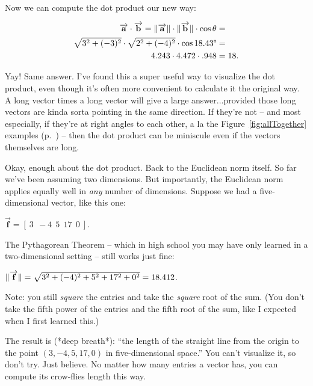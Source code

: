 Now we can compute the dot product our new way:

\vspace{-.15in}
\begin{align*}
\overrightarrow{\textbf{a}} \cdot \overrightarrow{\textbf{b}} = 
\lVert\overrightarrow{\textbf{a}}\rVert \cdot \lVert\overrightarrow{\textbf{b}}\rVert
\cdot \cos
\theta &= \\
\sqrt{3^2+(-3)^2} \cdot \sqrt{2^2+(-4)^2} \cdot \cos 18.43\degree &= \\
4.243 \cdot 4.472 \cdot .948 & = 18. \\
\end{align*}

Yay! Same answer. I've found this a super useful way to visualize the dot
product, even though it's often more convenient to calculate it the original
way. A long vector times a long vector will give a large answer...provided
those long vectors are kinda sorta pointing in the same direction. If they're
not -- and most especially, if they're at right angles to each other, a la the
Figure~\ref{fig:allTogether} examples (p.~\pageref{fig:allTogether}) -- then
the dot product can be miniscule even if the vectors themselves are long.

\bigskip

Okay, enough about the dot product. Back to the Euclidean norm itself. So far
we've been assuming two dimensions. But importantly, the Euclidean norm applies
equally well in \textit{any} number of dimensions. Suppose we had a
five-dimensional vector, like this one:

\begin{center}
$\overrightarrow{\textbf{f}} = [\ 3\ \ -4\ \ 5\ \ 17\ \ 0\ ]$.
\end{center}

The Pythagorean Theorem -- which in high school you may have only learned in a
two-dimensional setting -- still works just fine:

\begin{center}
$\lVert\overrightarrow{\textbf{f}}\rVert =
\sqrt{3^2 + (-4)^2 + 5^2 + 17^2 + 0^2} = 18.412$.
\end{center}

Note: you still \textit{square} the entries and take the \textit{square} root
of the sum. (You don't take the fifth power of the entries and the fifth root
of the sum, like I expected when I first learned this.)

The result is (*deep breath*): ``the length of the straight line from the
origin to the point $(3,-4,5,17,0)$ in five-dimensional space.'' You can't
visualize it, so don't try. Just believe. No matter how many entries a vector
has, you can compute its crow-flies length this way.


